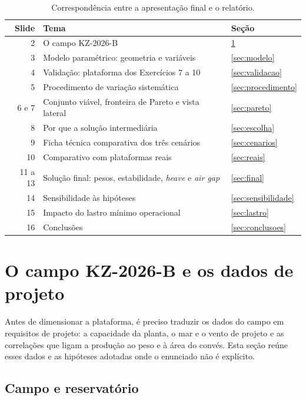 \documentclass[11pt,a4paper]{article}
\begin{document}
\begin{table}[!htb]
\centering
\caption{Correspondência entre a apresentação final e o relatório.}\label{tab:mapa}
\small
\begin{tabular}{rll}
\toprule
Slide & Tema & Seção \\
\midrule
2 & O campo KZ-2026-B & \ref{sec:dados} \\
3 & Modelo paramétrico: geometria e variáveis & \ref{sec:modelo} \\
4 & Validação: plataforma dos Exercícios 7 a 10 & \ref{sec:validacao} \\
5 & Procedimento de variação sistemática & \ref{sec:procedimento} \\
6 e 7 & Conjunto viável, fronteira de Pareto e vista lateral & \ref{sec:pareto} \\
8 & Por que a solução intermediária & \ref{sec:escolha} \\
9 & Ficha técnica comparativa dos três cenários & \ref{sec:cenarios} \\
10 & Comparativo com plataformas reais & \ref{sec:reais} \\
11 a 13 & Solução final: pesos, estabilidade, \emph{heave} e \emph{air gap} & \ref{sec:final} \\
14 & Sensibilidade às hipóteses & \ref{sec:sensibilidade} \\
15 & Impacto do lastro mínimo operacional & \ref{sec:lastro} \\
16 & Conclusões & \ref{sec:conclusoes} \\
\bottomrule
\end{tabular}
\end{table}

\section{O campo KZ-2026-B e os dados de projeto}\label{sec:dados}

Antes de dimensionar a plataforma, é preciso traduzir os dados do campo em requisitos de
projeto: a capacidade da planta, o mar e o vento de projeto e as correlações que ligam a
produção ao peso e à área do convés. Esta seção reúne esses dados e as hipóteses adotadas onde o
enunciado não é explícito.

\subsection{Campo e reservatório}
\end{document}
